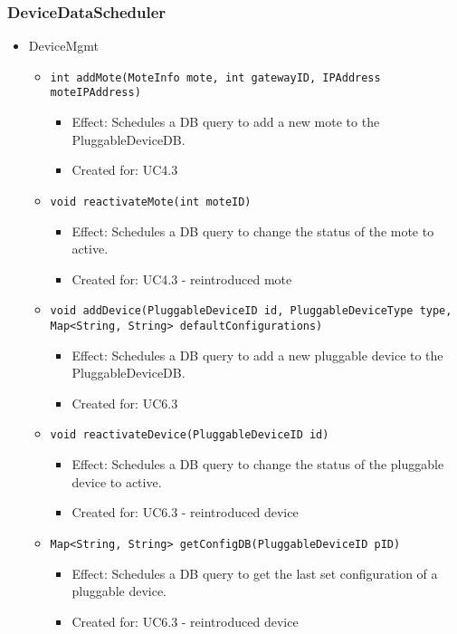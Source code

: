 {{{    \subsubsection{DeviceDataScheduler}
        \begin{itemize}
            \item DeviceMgmt
            \begin{itemize}
                \item \texttt{int addMote(MoteInfo mote, int gatewayID, IPAddress moteIPAddress)}
                    \begin{itemize}
                        \item Effect: Schedules a DB query to add a new mote to the PluggableDeviceDB.
                        \item Created for: UC4.3
                    \end{itemize}
                \item \texttt{void reactivateMote(int moteID)}
                    \begin{itemize}
                        \item Effect: Schedules a DB query to change the status of the mote to active.
                        \item Created for: UC4.3 - reintroduced mote
                    \end{itemize}
                \item \texttt{void addDevice(PluggableDeviceID id, PluggableDeviceType type, Map<String, String> defaultConfigurations)}
                    \begin{itemize}
                        \item Effect: Schedules a DB query to add a new pluggable device to the PluggableDeviceDB.
                        \item Created for: UC6.3
                    \end{itemize}
                \item \texttt{void reactivateDevice(PluggableDeviceID id)}
                    \begin{itemize}
                        \item Effect: Schedules a DB query to change the status of the pluggable device to active.
                        \item Created for: UC6.3 - reintroduced device
                    \end{itemize}
                \item \texttt{Map<String, String> getConfigDB(PluggableDeviceID pID)}
                    \begin{itemize}
                        \item Effect: Schedules a DB query to get the last set configuration of a pluggable device.
                        \item Created for: UC6.3 - reintroduced device
                    \end{itemize}
            \end{itemize}


\end{itemize}}}}
